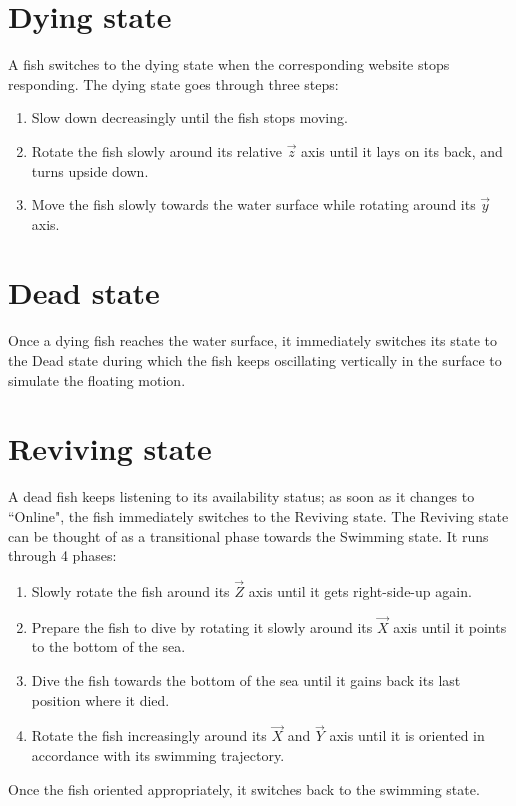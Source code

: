 \section{Dying state}
A fish switches to the dying state when the corresponding website stops responding. The dying state goes through three steps:
\begin{enumerate}
\item Slow down decreasingly until the fish stops moving.
\item Rotate the fish slowly around its relative $\overrightarrow{z}$ axis until it lays on its back, and turns upside down.
\item Move the fish slowly towards the water surface while rotating around its $\overrightarrow{y}$ axis.
\end{enumerate}

\section{Dead state}
Once a dying fish reaches the water surface, it immediately switches its state to the Dead state during which the fish keeps oscillating vertically in the surface to simulate the floating motion.

\section{Reviving state}
A dead fish keeps listening to its availability status; as soon as it changes to ``Online", the fish immediately switches to  the Reviving state. The Reviving state can be thought of as a transitional phase towards the Swimming state. It runs through 4 phases:
\begin{enumerate}
\item Slowly rotate the fish around its $\overrightarrow{Z}$ axis until it gets right-side-up again.
\item Prepare the fish to dive by rotating it slowly around its $\overrightarrow{X}$ axis until it points to the bottom of the sea.
\item Dive the fish towards the bottom of the sea until it gains back its last position where it died.
\item Rotate the fish increasingly around its $\overrightarrow{X}$ and $\overrightarrow{Y}$ axis until it is oriented in accordance with its swimming trajectory.
\end{enumerate}
Once the fish oriented appropriately, it switches back to the swimming state.

